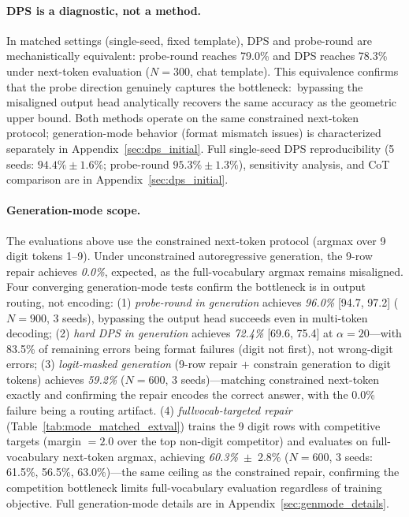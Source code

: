 \documentclass{article}
\begin{document}
\paragraph{DPS is a diagnostic, not a method.}
In matched settings (single-seed, fixed template), DPS and probe-round are mechanistically equivalent:
probe-round reaches 79.0\% and DPS reaches 78.3\% under next-token evaluation ($N{=}300$, chat template).
This equivalence confirms that the probe direction genuinely captures the bottleneck:~bypassing the misaligned output head analytically recovers the same accuracy as the geometric upper bound.
Both methods operate on the same constrained next-token protocol; generation-mode behavior (format mismatch issues) is characterized separately in Appendix~\ref{sec:dps_initial}.
Full single-seed DPS reproducibility (5 seeds: $94.4\% \pm 1.6\%$; probe-round $95.3\% \pm 1.3\%$),
sensitivity analysis, and CoT comparison are in Appendix~\ref{sec:dps_initial}.

\paragraph{Generation-mode scope.}
The evaluations above use the constrained next-token protocol (argmax over 9 digit tokens 1--9).
Under unconstrained autoregressive generation, the 9-row repair achieves \emph{0.0\%}, expected, as the full-vocabulary argmax remains misaligned.
Four converging generation-mode tests confirm the bottleneck is in output routing, not encoding:
(1) \emph{probe-round in generation} achieves \emph{96.0\%} [94.7, 97.2] ($N{=}900$, 3 seeds), bypassing the output head succeeds even in multi-token decoding;
(2) \emph{hard DPS in generation} achieves \emph{72.4\%} [69.6, 75.4] at $\alpha{=}20$---with 83.5\% of remaining errors being format failures (digit not first), not wrong-digit errors;
(3) \emph{logit-masked generation} (9-row repair + constrain generation to digit tokens) achieves \emph{59.2\%} ($N{=}600$, 3 seeds)---matching constrained next-token exactly and confirming the repair encodes the correct answer, with the 0.0\% failure being a routing artifact.
(4) \emph{fullvocab-targeted repair} (Table~\ref{tab:mode_matched_extval}) trains the 9 digit rows with competitive targets (margin $= 2.0$ over the top non-digit competitor) and evaluates on full-vocabulary next-token argmax, achieving \emph{60.3\%}~$\pm$~2.8\% ($N{=}600$, 3 seeds: 61.5\%, 56.5\%, 63.0\%)---the same ceiling as the constrained repair, confirming the competition bottleneck limits full-vocabulary evaluation regardless of training objective.
Full generation-mode details are in Appendix~\ref{sec:genmode_details}.
\end{document}
